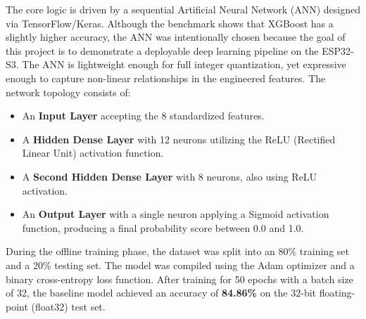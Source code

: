 The core logic is driven by a sequential Artificial Neural Network (ANN) designed via TensorFlow/Keras. Although the benchmark shows that XGBoost has a slightly higher accuracy, the ANN was intentionally chosen because the goal of this project is to demonstrate a deployable deep learning pipeline on the ESP32-S3. The ANN is lightweight enough for full integer quantization, yet expressive enough to capture non-linear relationships in the engineered features. The network topology consists of:
\begin{itemize}
    \item An \textbf{Input Layer} accepting the 8 standardized features.
    \item A \textbf{Hidden Dense Layer} with 12 neurons utilizing the ReLU (Rectified Linear Unit) activation function.
    \item A \textbf{Second Hidden Dense Layer} with 8 neurons, also using ReLU activation.
    \item An \textbf{Output Layer} with a single neuron applying a Sigmoid activation function, producing a final probability score between 0.0 and 1.0.
\end{itemize}

During the offline training phase, the dataset was split into an 80\% training set and a 20\% testing set. The model was compiled using the Adam optimizer and a binary cross-entropy loss function. After training for 50 epochs with a batch size of 32, the baseline model achieved an accuracy of \textbf{84.86\%} on the 32-bit floating-point (float32) test set.

\begin{table}[H]
    \centering
    \caption{Benchmark Comparison of Candidate Models}
    \label{tab:model_benchmark}
\end{table}

